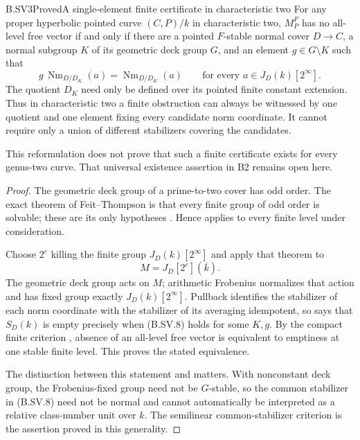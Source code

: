 \begin{claim}{B.SV3}{Proved}{A single-element finite certificate in characteristic two}
For any proper hyperbolic pointed curve $(C,P)/k$ in
characteristic two, $M_P^F$ has no all-level free vector if
and only if there are a pointed $F$-stable normal cover
$D\to C$, a normal subgroup $K$ of its geometric deck group
$G$, and an element $g\in G\setminus K$ such that
\[
 g\,\operatorname{Nm}_{D/D_K}(a)
       =\operatorname{Nm}_{D/D_K}(a)
        \qquad\text{for every }a\in J_D(k)[2^\infty].          \tag{B.SV.8}
\]
The quotient $D_K$ need only be defined over its pointed
finite constant extension. Thus in characteristic two a
finite obstruction can always be witnessed by one quotient
and one element fixing every candidate norm coordinate.
It cannot require only a union of different stabilizers
covering the candidates.

This reformulation does not prove that such a finite
certificate exists for every genus-two curve. That universal
existence assertion in B2 remains open here.
\end{claim}
\begin{proof}
The geometric deck group of a prime-to-two cover has odd
order. The exact theorem of Feit--Thompson is that every
finite group of odd order is solvable; these are its only
hypotheses \citep[Chapter~I, \S1, p.~775, unnumbered main
theorem]{FeitThompson1963}. Hence  applies
to every finite level under consideration.

Choose $2^e$ killing the finite group $J_D(k)[2^\infty]$
and apply that theorem to
\[
                      M=J_D[2^e](\overline k).
\]
The geometric deck group acts on $M$; arithmetic Frobenius
normalizes that action and has fixed group exactly
$J_D(k)[2^\infty]$. Pullback identifies the stabilizer of
each norm coordinate with the stabilizer of its averaging
idempotent, so  says that $S_D(k)$
is empty precisely when (B.SV.8) holds for some $K,g$.
By the compact finite criterion , absence
of an all-level free vector is equivalent to emptiness at
one stable finite level. This proves the stated equivalence.

The distinction between this statement and
 matters. With nonconstant deck group,
the Frobenius-fixed group need not be $G$-stable, so the
common stabilizer in (B.SV.8) need not be normal and cannot
automatically be interpreted as a relative class-number unit
over $k$. The semilinear common-stabilizer criterion is the
assertion proved in this generality.
\end{proof}

